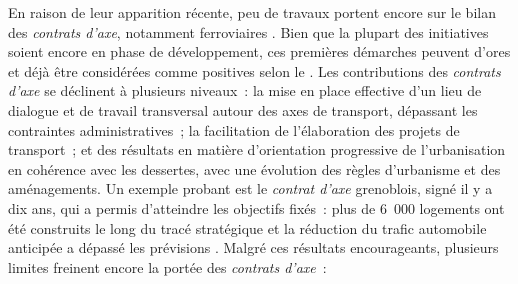 \begin{refsegment}
En raison de leur apparition récente, peu de travaux portent encore sur le bilan des \textsl{contrats d’axe}, notamment ferroviaires \textcolor{blue}{\autocite{fandio_contrat_2023}}. Bien que la plupart des initiatives soient encore en phase de développement, ces premières démarches peuvent d'ores et déjà être considérées comme positives selon le \textcolor{blue}{\textcite[17-18]{cerema_articuler_2015}}. Les contributions des \textsl{contrats d’axe} se déclinent à plusieurs niveaux~: la mise en place effective d’un lieu de dialogue et de travail transversal autour des axes de transport, dépassant les contraintes administratives~; la facilitation de l’élaboration des projets de transport~; et des résultats en matière d'orientation progressive de l’urbanisation en cohérence avec les dessertes, avec une évolution des règles d’urbanisme et des aménagements. Un exemple probant est le \textsl{contrat d’axe} grenoblois, signé il y a dix ans, qui a permis d’atteindre les objectifs fixés~: plus de 6~000 logements ont été construits le long du tracé stratégique et la réduction du trafic automobile anticipée a dépassé les prévisions \textcolor{blue}{\autocites[7]{aurg_contrat_2022}[2]{cerema_outils_2021}}. Malgré ces résultats encourageants, plusieurs limites freinent encore la portée des \textsl{contrats d’axe}~:
    \begin{customitemize}

\end{customitemize}
\end{refsegment}

